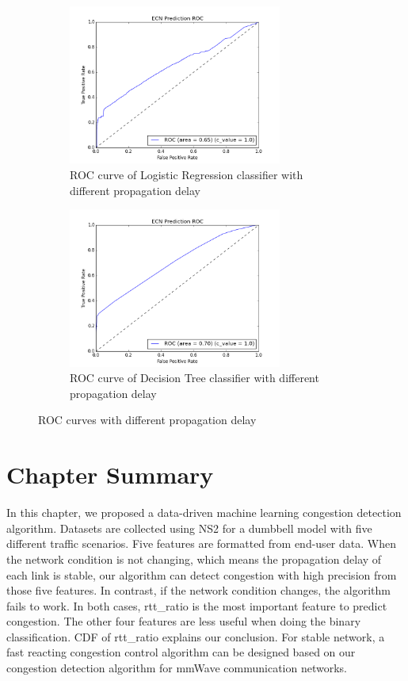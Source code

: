 \begin{figure}[!htb]\centering
\begin{subfigure}{0.49\textwidth}
\includegraphics[width=7cm]{LRRocDiffProp.png}
\caption{ROC curve of Logistic Regression classifier with different propagation delay}
\label{LRROCDiff}
\end{subfigure}
\begin{subfigure}{0.49\textwidth}
\includegraphics[width=7cm]{DTRocDiffProp.png}
\caption{ROC curve of Decision Tree classifier with different propagation delay}
\label{DTROCDiff}
\end{subfigure}
\caption{ROC curves with different propagation delay}
\label{fig:roc2}
\end{figure}




\section{Chapter Summary}
\label{Conclusions and Future Work}
In this chapter, we proposed a data-driven machine learning congestion detection algorithm. Datasets are collected using NS2 for a dumbbell model with five different traffic scenarios. Five features are formatted from end-user data. When the network condition is not changing, which means the propagation delay of each link is stable, our algorithm can detect congestion with high precision from those five features. In contrast, if the network condition changes, the algorithm fails to work. In both cases, rtt\_ratio is the most important feature to predict congestion. The other four features are less useful when doing the binary classification. CDF of rtt\_ratio explains our conclusion. For stable network, a fast reacting congestion control algorithm can be designed based on our congestion detection algorithm for mmWave communication networks.
